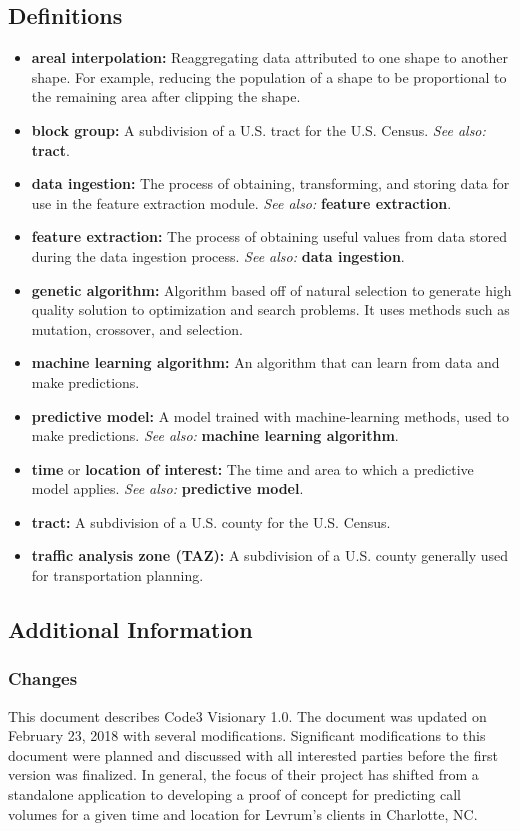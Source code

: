 \documentclass[onecolumn, draftclsnofoot,10pt, compsoc]{IEEEtran}
\begin{document}
\begin{singlespace}
    \subsection{Definitions}
    \begin{itemize}
        \item \textbf{areal interpolation:} Reaggregating data attributed to one shape to another shape. For example, reducing the population of a shape to be proportional to the remaining area after clipping the shape.
        \item \textbf{block group:} A subdivision of a U.S. tract for the U.S. Census.
        \textit{See also:} \textbf{tract}.
        \item \textbf{data ingestion:} The process of obtaining, transforming, and storing data for use in the feature extraction module. \textit{See also:} \textbf{feature extraction}.
        \item \textbf{feature extraction:} The process of obtaining useful values from data stored during the data ingestion process. \textit{See also:} \textbf{data ingestion}.
        \item \textbf{genetic algorithm:} Algorithm based off of natural selection to generate high quality solution to optimization and search problems. It uses methods such as mutation, crossover, and selection.
        \item \textbf{machine learning algorithm:} An algorithm that can learn from data and make predictions.
        \item \textbf{predictive model:} A model trained with machine-learning methods, used to make predictions.
        \textit{See also:} \textbf{machine learning algorithm}.
        \item \textbf{time} or \textbf{location of interest:} The time and area to which a predictive model applies. 
        \textit{See also:} \textbf{predictive model}.
        \item \textbf{tract:} A subdivision of a U.S. county for the U.S. Census.
        \item \textbf{traffic analysis zone (TAZ):} A subdivision of a U.S. county generally used for transportation planning. 

    \end{itemize}

    \subsection{Additional Information}
        \subsubsection{Changes}
        This document describes Code3 Visionary 1.0. The document was updated on February 23, 2018 with several modifications. Significant modifications to this document were planned and discussed with all interested parties before the first version was finalized. In general, the focus of their project has shifted from a standalone application to developing a proof of concept for predicting call volumes for a given time and location for Levrum's clients in Charlotte, NC.
        

\end{singlespace}
\end{document}
